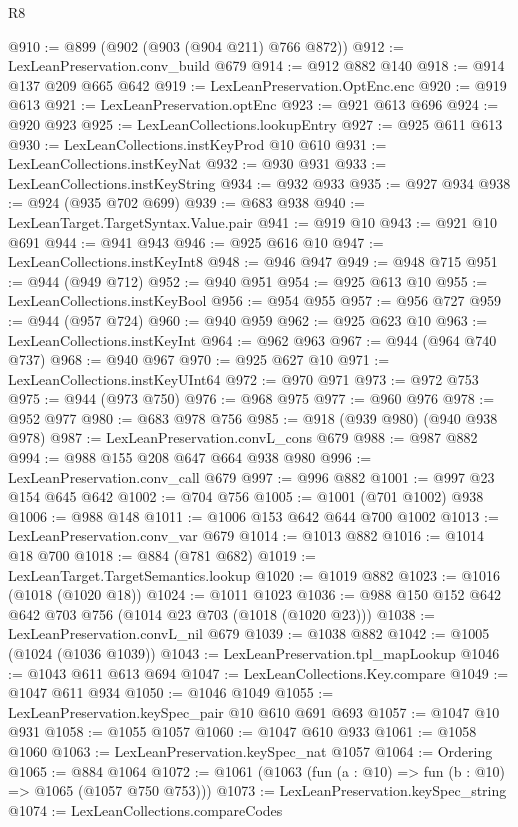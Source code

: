 \begin{lexlean}{R8}
\begin{coremodule}
{{{{{{{{{{{{{{{{{{{{{{{{{{{{{{{{{{{{{{{{@910 := @899 (@902 (@903 (@904 @211) @766 @872))
@912 := LexLeanPreservation.conv_build @679
@914 := @912 @882 @140
@918 := @914 @137 @209 @665 @642
@919 := LexLeanPreservation.OptEnc.enc
@920 := @919 @613
@921 := LexLeanPreservation.optEnc
@923 := @921 @613 @696
@924 := @920 @923
@925 := LexLeanCollections.lookupEntry
@927 := @925 @611 @613
@930 := LexLeanCollections.instKeyProd @10 @610
@931 := LexLeanCollections.instKeyNat
@932 := @930 @931
@933 := LexLeanCollections.instKeyString
@934 := @932 @933
@935 := @927 @934
@938 := @924 (@935 @702 @699)
@939 := @683 @938
@940 := LexLeanTarget.TargetSyntax.Value.pair
@941 := @919 @10
@943 := @921 @10 @691
@944 := @941 @943
@946 := @925 @616 @10
@947 := LexLeanCollections.instKeyInt8
@948 := @946 @947
@949 := @948 @715
@951 := @944 (@949 @712)
@952 := @940 @951
@954 := @925 @613 @10
@955 := LexLeanCollections.instKeyBool
@956 := @954 @955
@957 := @956 @727
@959 := @944 (@957 @724)
@960 := @940 @959
@962 := @925 @623 @10
@963 := LexLeanCollections.instKeyInt
@964 := @962 @963
@967 := @944 (@964 @740 @737)
@968 := @940 @967
@970 := @925 @627 @10
@971 := LexLeanCollections.instKeyUInt64
@972 := @970 @971
@973 := @972 @753
@975 := @944 (@973 @750)
@976 := @968 @975
@977 := @960 @976
@978 := @952 @977
@980 := @683 @978 @756
@985 := @918 (@939 @980) (@940 @938 @978)
@987 := LexLeanPreservation.convL_cons @679
@988 := @987 @882
@994 := @988 @155 @208 @647 @664 @938 @980
@996 := LexLeanPreservation.conv_call @679
@997 := @996 @882
@1001 := @997 @23 @154 @645 @642
@1002 := @704 @756
@1005 := @1001 (@701 @1002) @938
@1006 := @988 @148
@1011 := @1006 @153 @642 @644 @700 @1002
@1013 := LexLeanPreservation.conv_var @679
@1014 := @1013 @882
@1016 := @1014 @18 @700
@1018 := @884 (@781 @682)
@1019 := LexLeanTarget.TargetSemantics.lookup
@1020 := @1019 @882
@1023 := @1016 (@1018 (@1020 @18))
@1024 := @1011 @1023
@1036 := @988 @150 @152 @642 @642 @703 @756 (@1014 @23 @703 (@1018 (@1020 @23)))
@1038 := LexLeanPreservation.convL_nil @679
@1039 := @1038 @882
@1042 := @1005 (@1024 (@1036 @1039))
@1043 := LexLeanPreservation.tpl_mapLookup
@1046 := @1043 @611 @613 @694
@1047 := LexLeanCollections.Key.compare
@1049 := @1047 @611 @934
@1050 := @1046 @1049
@1055 := LexLeanPreservation.keySpec_pair @10 @610 @691 @693
@1057 := @1047 @10 @931
@1058 := @1055 @1057
@1060 := @1047 @610 @933
@1061 := @1058 @1060
@1063 := LexLeanPreservation.keySpec_nat @1057
@1064 := Ordering
@1065 := @884 @1064
@1072 := @1061 (@1063 (fun (a : @10) => fun (b : @10) => @1065 (@1057 @750 @753)))
@1073 := LexLeanPreservation.keySpec_string
@1074 := LexLeanCollections.compareCodes
}}}}}}}}}}}}}}}}}}}}}}}}}}}}}}}}}}}}}}}}
\end{coremodule}
\end{lexlean}
